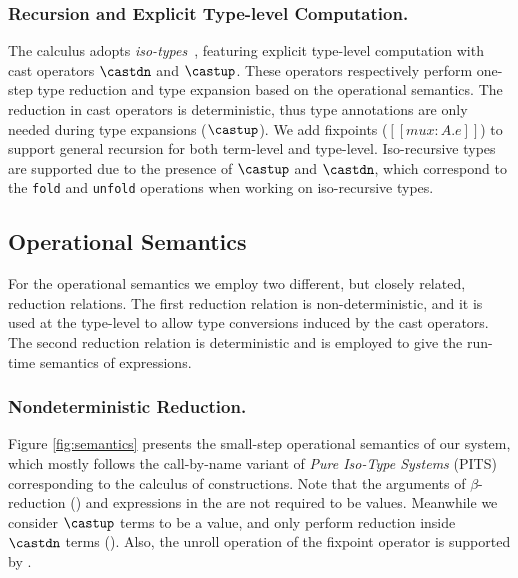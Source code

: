 \subsubsection{Recursion and Explicit Type-level Computation.}
\label{sec:cast}
The \name calculus adopts \emph{iso-types}~\cite{yang2016unified},
featuring explicit type-level computation with cast operators
$\castdn$ and $\castup$. These operators respectively perform one-step
type reduction and type expansion based on the operational semantics.
The reduction in cast operators is deterministic, thus type
annotations are only needed during type expansions ($\castup$). We add
fixpoints ($[[mu x : A. e]]$) to support general recursion for both
term-level and type-level. Iso-recursive types are supported due to
the presence of $\castup$ and $\castdn$, which correspond to the
\verb|fold| and \verb|unfold| operations when working on iso-recursive types.

\subsection{Operational Semantics}


For the operational semantics we employ two different, but closely related,
reduction relations. The first reduction relation is non-deterministic, and
it is used at the type-level to allow type conversions induced
by the cast operators. The second reduction relation is deterministic and
is employed to give the run-time semantics of expressions.

\subsubsection{Nondeterministic Reduction.}
Figure \ref{fig:semantics} presents the small-step operational semantics of our system,
which mostly follows the call-by-name variant of \emph{Pure Iso-Type Systems} (PITS)
\cite{yang2019pure} corresponding to the calculus of constructions.
Note that the arguments of $\beta$-reduction () and expressions in
the  are not required to be values.
Meanwhile we consider $\castup$ terms to be a value,
and only perform reduction inside $\castdn$ terms (). Also, the unroll
operation of the fixpoint operator is supported by .

